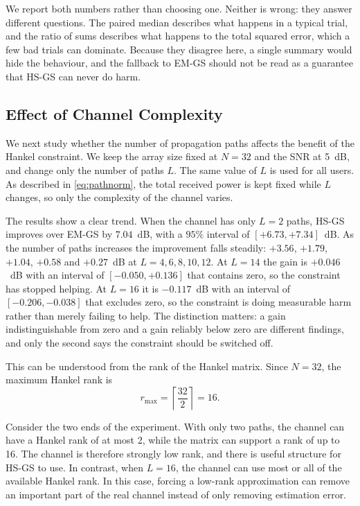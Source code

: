 \documentclass[journal]{IEEEtran}
\newcommand{\rmax}{r_{\mathrm{max}}}
\begin{document}
We report both numbers rather than choosing one. Neither is wrong: they answer
different questions. The paired median describes what happens in a typical
trial, and the ratio of sums describes what happens to the total squared error,
which a few bad trials can dominate. Because they disagree here, a single
summary would hide the behaviour, and the fallback to EM-GS should not be read
as a guarantee that HS-GS can never do harm.

\subsection{Effect of Channel Complexity}
\label{sec:pathcount}

We next study whether the number of propagation paths affects the benefit of
the Hankel constraint. We keep the array size fixed at $N=32$ and the SNR at
5~dB, and change only the number of paths $L$. The same value of $L$ is used
for all users. As described in \eqref{eq:pathnorm}, the total received power is
kept fixed while $L$ changes, so only the complexity of the channel varies.

The results show a clear trend. When the channel has only $L=2$ paths, HS-GS
improves over EM-GS by $7.04$~dB, with a $95\%$ interval of
$[+6.73,+7.34]$~dB. As the number of paths increases the improvement falls
steadily: $+3.56$, $+1.79$, $+1.04$, $+0.58$ and $+0.27$~dB at
$L=4,6,8,10,12$. At $L=14$ the gain is $+0.046$~dB with an interval of
$[-0.050,+0.136]$ that contains zero, so the constraint has stopped helping.
At $L=16$ it is $-0.117$~dB with an interval of $[-0.206,-0.038]$ that
excludes zero, so the constraint is doing measurable harm rather than merely
failing to help. The distinction matters: a gain indistinguishable from zero
and a gain reliably below zero are different findings, and only the second
says the constraint should be switched off.

This can be understood from the rank of the Hankel matrix. Since $N=32$, the
maximum Hankel rank is
\begin{equation}
\rmax=\left\lceil\frac{32}{2}\right\rceil=16.
\end{equation}

Consider the two ends of the experiment. With only two paths, the channel can
have a Hankel rank of at most 2, while the matrix can support a rank of up to
16. The channel is therefore strongly low rank, and there is useful structure
for HS-GS to use. In contrast, when $L=16$, the channel can use most or all of
the available Hankel rank. In this case, forcing a low-rank approximation can
remove an important part of the real channel instead of only removing
estimation error.
\end{document}
